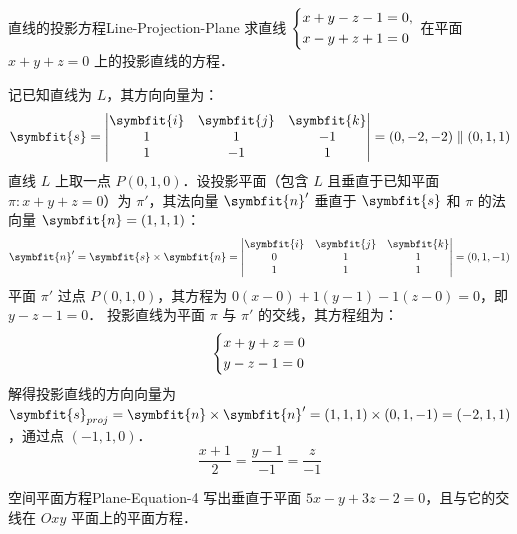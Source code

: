\begin{problem}{直线的投影方程}{Line-Projection-Plane}
    求直线 $\begin{dcases} x + y - z - 1 = 0, \\ x - y + z + 1 = 0 \end{dcases}$ 在平面 $x + y + z = 0$ 上的投影直线的方程．
\end{problem}

\begin{solution}
    记已知直线为 $L$，其方向向量为：
    \begin{equation}
        \symbfit{s} = \begin{vmatrix} \symbfit{i} & \symbfit{j} & \symbfit{k} \\ 1 & 1 & -1 \\ 1 & -1 & 1 \end{vmatrix} = (0, -2, -2) \parallel (0, 1, 1)
    \end{equation}
    直线 $L$ 上取一点 $P(0, 1, 0)$．设投影平面（包含 $L$ 且垂直于已知平面 $\pi: x + y + z = 0$）为 $\pi'$，其法向量 $\symbfit{n}'$ 垂直于 $\symbfit{s}$ 和 $\pi$ 的法向量 $\symbfit{n} = (1, 1, 1)$：
    \begin{equation}
        \symbfit{n}' = \symbfit{s} \times \symbfit{n} = \begin{vmatrix} \symbfit{i} & \symbfit{j} & \symbfit{k} \\ 0 & 1 & 1 \\ 1 & 1 & 1 \end{vmatrix} = (0, 1, -1)
    \end{equation}
    平面 $\pi'$ 过点 $P(0, 1, 0)$，其方程为 $0(x - 0) + 1(y - 1) - 1(z - 0) = 0$，即 $y - z - 1 = 0$．
    投影直线为平面 $\pi$ 与 $\pi'$ 的交线，其方程组为：
    \begin{equation}
        \begin{dcases} x + y + z = 0 \\ y - z - 1 = 0 \end{dcases}
    \end{equation}
    解得投影直线的方向向量为 $\symbfit{s}_{proj} = \symbfit{n} \times \symbfit{n}' = (1, 1, 1) \times (0, 1, -1) = (-2, 1, 1)$，通过点 $(-1, 1, 0)$．
    \begin{equation}
        \boxed{\frac{x + 1}{2} = \frac{y - 1}{-1} = \frac{z}{-1}}
    \end{equation}
\end{solution}


\begin{problem}{空间平面方程}{Plane-Equation-4}
    写出垂直于平面 $5x - y + 3z - 2 = 0$，且与它的交线在 $Oxy$ 平面上的平面方程．
\end{problem}

